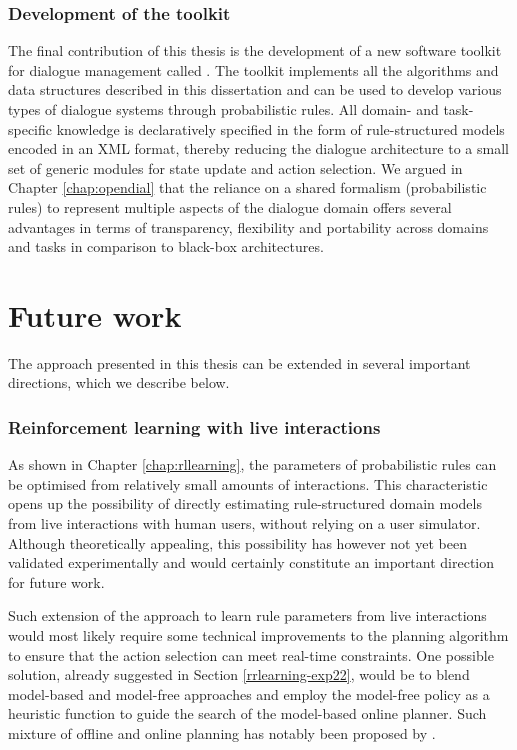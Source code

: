 

\subsubsection*{Development of the \opendial toolkit}

The final contribution of this thesis is the development of a new software toolkit for dialogue management called \opendial. The toolkit implements all the algorithms and data structures described in this dissertation and can be used to develop various types of dialogue systems through probabilistic rules. All domain- and task-specific knowledge is declaratively specified in the form of rule-structured models encoded in an XML format, thereby reducing the dialogue architecture to a small set of generic modules for state update and action selection.  We argued in Chapter \ref{chap:opendial} that the reliance on a shared   formalism (probabilistic rules) to represent multiple aspects of the dialogue domain offers several advantages in terms of transparency, flexibility and portability across domains and tasks in comparison to black-box architectures.

\section{Future work}

The approach presented in this thesis can be extended in several important directions, which we describe below. 

\subsubsection*{Reinforcement learning with live interactions}

As shown in Chapter \ref{chap:rllearning}, the parameters of probabilistic rules can be optimised from relatively small amounts of interactions.  This characteristic opens up the possibility of directly estimating rule-structured domain models from live interactions with human users, without relying on a user simulator.  Although theoretically appealing, this possibility has however not yet been validated experimentally and would certainly constitute an important direction for future work.

Such extension of the approach to learn rule parameters from live interactions would most likely require some technical improvements to the planning algorithm to ensure that the action selection can meet real-time constraints. One possible solution, already suggested in Section \ref{rrlearning-exp22}, would be to blend model-based and model-free approaches and employ the model-free policy as a heuristic function to guide the search of the model-based online planner.  Such mixture of offline and online planning has notably been proposed by \cite{RossC07}. 


